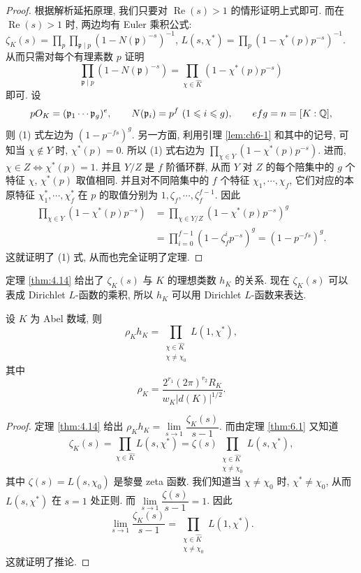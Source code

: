 \begin{proof}
根据解析延拓原理, 我们只要对 $\operatorname{Re}(s)>1$ 的情形证明上式即可. 而在 $\operatorname{Re}(s)>1$ 时, 两边均有 Euler 乘积公式: $\zeta_K(s)=\prod_p\prod_{\mathfrak{p}\mid p}(1-N(\mathfrak{p})^{-s})^{-1}$, $L(s,\chi^*)=\prod_p(1-\chi^*(p)p^{-s})^{-1}$. 从而只需对每个有理素数 $p$ 证明
\begin{equation}\tag{1}
  \prod_{\mathfrak{p}\mid p}(1-N(\mathfrak{p})^{-s})=\prod_{\chi\in\widehat{K}}(1-\chi^*(p)p^{-s})
\end{equation}
即可. 设
\[
  pO_K=(\mathfrak{p}_1\cdots\mathfrak{p}_g)^e,\qquad N(\mathfrak{p}_i)=p^f\ (1\leqslant i\leqslant g),\qquad efg=n=[K:\mathbb{Q}],
\]
则 (1) 式左边为 $(1-p^{-fs})^g$. 另一方面, 利用引理 \ref{lem:ch6-1} 和其中的记号, 可知当 $\chi\notin Y$ 时, $\chi^*(p)=0$. 所以 (1) 式右边为 $\prod_{\chi\in Y}(1-\chi^*(p)p^{-s})$. 进而, $\chi\in Z\Leftrightarrow\chi^*(p)=1$. 并且 $Y/Z$ 是 $f$ 阶循环群, 从而 $Y$ 对 $Z$ 的每个陪集中的 $g$ 个特征 $\chi$, $\chi^*(p)$ 取值相同. 并且对不同陪集中的 $f$ 个特征 $\chi_1,\cdots,\chi_f$, 它们对应的本原特征 $\chi_1^*,\cdots,\chi_f^*$ 在 $p$ 的取值分别为 $1,\zeta_f,\cdots,\zeta_f^{f-1}$. 因此
\begin{align*}
  \prod_{\chi\in Y}(1-\chi^*(p)p^{-s})
  &=\prod_{\chi\in Y/Z}(1-\chi^*(p)p^{-s})^g\\
  &=\prod_{i=0}^{f-1}(1-\zeta_f^ip^{-s})^g=(1-p^{-fs})^g.
\end{align*}
这就证明了 (1) 式, 从而也完全证明了定理.
\end{proof}

定理 \ref{thm:4.14} 给出了 $\zeta_K(s)$ 与 $K$ 的理想类数 $h_K$ 的关系. 现在 $\zeta_K(s)$ 可以表成 Dirichlet $L$-函数的乘积, 所以 $h_K$ 可以用 Dirichlet $L$-函数来表达.

\begin{corollarynonum}
设 $K$ 为 Abel 数域, 则
\[
  \rho_Kh_K=\prod_{\substack{\chi\in\widehat{K}\\ \chi\neq\chi_0}}L(1,\chi^*),
\]
其中
\[
  \rho_K=\frac{2^{r_1}(2\pi)^{r_2}R_K}{w_K|d(K)|^{1/2}}.
\]
\end{corollarynonum}

\begin{proof}
定理 \ref{thm:4.14} 给出 $\rho_Kh_K=\lim\limits_{s\to1}\dfrac{\zeta_K(s)}{s-1}$. 而由定理 \ref{thm:6.1} 又知道
\[
  \zeta_K(s)=\prod_{\chi\in\widehat{K}}L(s,\chi^*)=\zeta(s)\prod_{\substack{\chi\in\widehat{K}\\ \chi\neq\chi_0}}L(s,\chi^*),
\]
其中 $\zeta(s)=L(s,\chi_0)$ 是黎曼 zeta 函数. 我们知道当 $\chi\neq\chi_0$ 时, $\chi^*\neq\chi_0$, 从而 $L(s,\chi^*)$ 在 $s=1$ 处正则. 而 $\lim\limits_{s\to1}\dfrac{\zeta(s)}{s-1}=1$. 因此
\[
  \lim_{s\to1}\frac{\zeta_K(s)}{s-1}=\prod_{\substack{\chi\in\widehat{K}\\ \chi\neq\chi_0}}L(1,\chi^*).
\]
这就证明了推论.
\end{proof}

